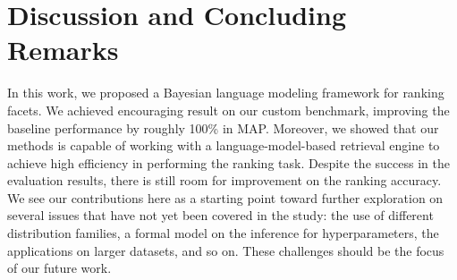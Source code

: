 \section{Discussion and Concluding Remarks}\label{s:concluding-remarks}

% 

In this work, we proposed a Bayesian language modeling framework for ranking
facets.  We achieved encouraging result on our custom benchmark, improving the
baseline performance by roughly 100\% in MAP.  Moreover, we showed that our
methods is capable of working with a language-model-based retrieval engine to
achieve high efficiency in performing the ranking task.  Despite the success in
the evaluation results, there is still room for improvement on the ranking
accuracy.  We see our contributions here as a starting point toward further
exploration on several issues that have not yet been covered in the study: the
use of different distribution families, a formal model on the inference for
hyperparameters, the applications on larger datasets, and so on.  These
challenges should be the focus of our future work.

